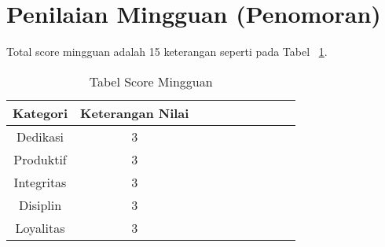 \section{Penilaian Mingguan (Penomoran)}
Total score mingguan adalah 15 keterangan seperti pada Tabel ~\ref{table:scoremingguan}.
\begin{table}[H]
\centering
\begin{tabular}{ |c|c|c|c|c|c|c|c|c|c| }
\hline
Kategori & Keterangan Nilai \\
\hline
Dedikasi & 3 \\
\hline
Produktif & 3 \\
\hline
Integritas & 3 \\
\hline
Disiplin & 3 \\
\hline
Loyalitas & 3 \\
\hline
\end{tabular}
\caption{Tabel Score Mingguan}
\label{table:scoremingguan}
\end{table}